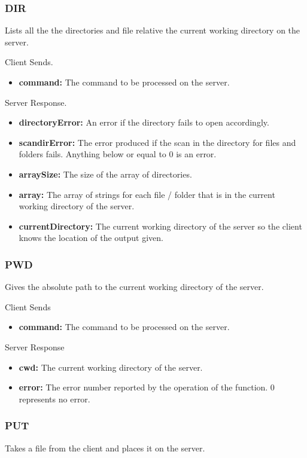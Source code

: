 \documentclass{article}
\begin{document}
\subsubsection{DIR}
Lists all the the directories and file relative the current working directory on the server.

Client Sends.
\begin{itemize}
\item \textbf{command:} The command to be processed on the server.
\end{itemize}

Server Response.
\begin{itemize}
\item \textbf{directoryError:} An error if the directory fails to open accordingly.
\item \textbf{scandirError:} The error produced if the scan in the directory for files and folders fails. Anything below or equal to 0 is an error.
\item \textbf{arraySize:} The size of the array of directories.
\item \textbf{array:} The array of strings for each file / folder that is in the current working directory of the server.
\item \textbf{currentDirectory:} The current working directory of the server so the client knows the location of the output given.
\end{itemize}

\subsubsection{PWD}
Gives the absolute path to the current working directory of the server.

Client Sends
\begin{itemize}
\item \textbf{command:} The command to be processed on the server.
\end{itemize}

Server Response
\begin{itemize}
\item \textbf{cwd:} The current working directory of the server.
\item \textbf{error:} The error number reported by the operation of the function. 0 represents no error.
\end{itemize}

\subsubsection{PUT}
Takes a file from the client and places it on the server.
\end{document}
